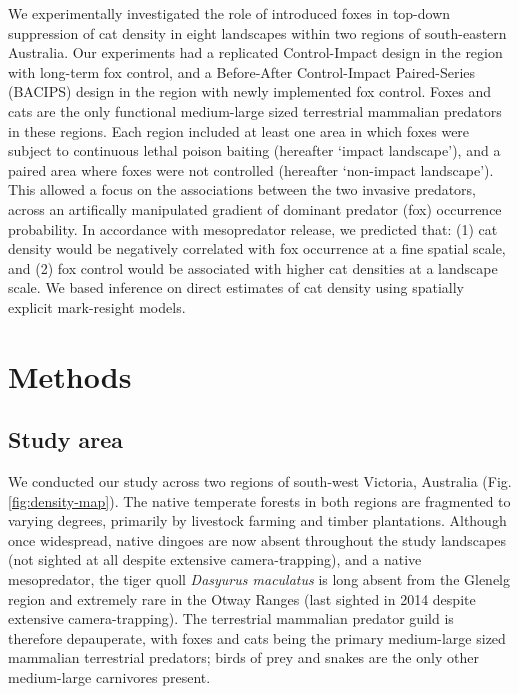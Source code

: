\documentclass[11pt,a4paper,titlepage,twoside,openright]{style/unimelbthesis}
\begin{document}
\begin{mainmatter}
We experimentally investigated the role of introduced foxes in top-down suppression of cat density in eight landscapes within two regions of south-eastern Australia. Our experiments had a replicated Control-Impact design in the region with long-term fox control, and a Before-After Control-Impact Paired-Series (BACIPS) design in the region with newly implemented fox control. Foxes and cats are the only functional medium-large sized terrestrial mammalian predators in these regions. Each region included at least one area in which foxes were subject to continuous lethal poison baiting (hereafter `impact landscape'), and a paired area where foxes were not controlled (hereafter `non-impact landscape'). This allowed a focus on the associations between the two invasive predators, across an artifically manipulated gradient of dominant predator (fox) occurrence probability. In accordance with mesopredator release, we predicted that: (1) cat density would be negatively correlated with fox occurrence at a fine spatial scale, and (2) fox control would be associated with higher cat densities at a landscape scale. We based inference on direct estimates of cat density using spatially explicit mark-resight models.

\newpage

\hypertarget{methods-2}{%
\section{Methods}\label{methods-2}}

\hypertarget{study-area-1}{%
\subsection{Study area}\label{study-area-1}}

We conducted our study across two regions of south-west Victoria, Australia (Fig. \ref{fig:density-map}). The native temperate forests in both regions are fragmented to varying degrees, primarily by livestock farming and timber plantations. Although once widespread, native dingoes are now absent throughout the study landscapes (not sighted at all despite extensive camera-trapping), and a native mesopredator, the tiger quoll \emph{Dasyurus maculatus} is long absent from the Glenelg region and extremely rare in the Otway Ranges (last sighted in 2014 despite extensive camera-trapping). The terrestrial mammalian predator guild is therefore depauperate, with foxes and cats being the primary medium-large sized mammalian terrestrial predators; birds of prey and snakes are the only other medium-large carnivores present.


\end{mainmatter}
\end{document}
